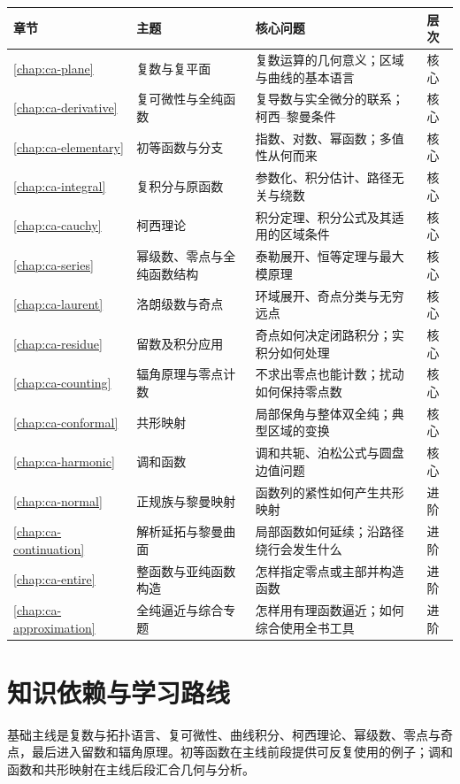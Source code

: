 \begin{longtable}{@{}p{}p{}p{}p{}@{}}
\toprule
章节 & 主题 & 核心问题 & 层次 \\
\midrule
\endhead
\ref{chap:ca-plane} & 复数与复平面 & 复数运算的几何意义；区域与曲线的基本语言 & 核心 \\
\ref{chap:ca-derivative} & 复可微性与全纯函数 & 复导数与实全微分的联系；柯西--黎曼条件 & 核心 \\
\ref{chap:ca-elementary} & 初等函数与分支 & 指数、对数、幂函数；多值性从何而来 & 核心 \\
\ref{chap:ca-integral} & 复积分与原函数 & 参数化、积分估计、路径无关与绕数 & 核心 \\
\ref{chap:ca-cauchy} & 柯西理论 & 积分定理、积分公式及其适用的区域条件 & 核心 \\
\ref{chap:ca-series} & 幂级数、零点与全纯函数结构 & 泰勒展开、恒等定理与最大模原理 & 核心 \\
\ref{chap:ca-laurent} & 洛朗级数与奇点 & 环域展开、奇点分类与无穷远点 & 核心 \\
\ref{chap:ca-residue} & 留数及积分应用 & 奇点如何决定闭路积分；实积分如何处理 & 核心 \\
\ref{chap:ca-counting} & 辐角原理与零点计数 & 不求出零点也能计数；扰动如何保持零点数 & 核心 \\
\ref{chap:ca-conformal} & 共形映射 & 局部保角与整体双全纯；典型区域的变换 & 核心 \\
\ref{chap:ca-harmonic} & 调和函数 & 调和共轭、泊松公式与圆盘边值问题 & 核心 \\
\ref{chap:ca-normal} & 正规族与黎曼映射 & 函数列的紧性如何产生共形映射 & 进阶 \\
\ref{chap:ca-continuation} & 解析延拓与黎曼曲面 & 局部函数如何延续；沿路径绕行会发生什么 & 进阶 \\
\ref{chap:ca-entire} & 整函数与亚纯函数构造 & 怎样指定零点或主部并构造函数 & 进阶 \\
\ref{chap:ca-approximation} & 全纯逼近与综合专题 & 怎样用有理函数逼近；如何综合使用全书工具 & 进阶 \\
\bottomrule
\end{longtable}

\section{知识依赖与学习路线}

基础主线是复数与拓扑语言、复可微性、曲线积分、柯西理论、幂级数、零点与奇点，最后进入留数和辐角原理。初等函数在主线前段提供可反复使用的例子；调和函数和共形映射在主线后段汇合几何与分析。

